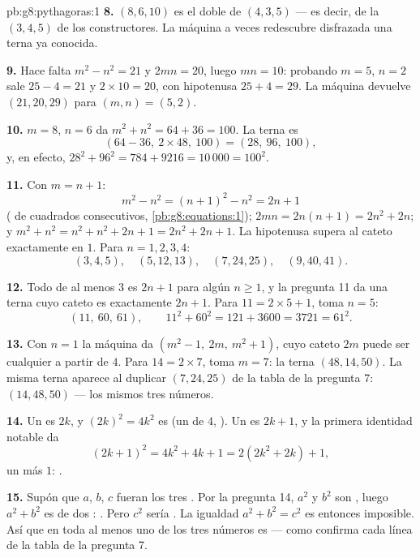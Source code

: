\begin{solution}{pb:g8:pythagoras:1}
\textbf{8.} $(8, 6, 10)$ es el doble de $(4, 3, 5)$ --- es decir,
de la $(3, 4, 5)$ de los constructores. La máquina a veces
redescubre disfrazada una terna ya conocida.

\textbf{9.} Hace falta $m^2 - n^2 = 21$ y $2mn = 20$, luego
$mn = 10$: probando $m = 5$, $n = 2$ sale $25 - 4 = 21$ y
$2 \times 10 = 20$, con hipotenusa $25 + 4 = 29$. La máquina
devuelve $(21, 20, 29)$ para $(m, n) = (5, 2)$.

\textbf{10.} $m = 8$, $n = 6$ da $m^2 + n^2 = 64 + 36 = 100$.
La terna es
\[
\left(64 - 36,\ 2 \times 48,\ 100\right) = (28,\ 96,\ 100),
\]
y, en efecto, $28^2 + 96^2 = 784 + 9216 = 10\,000 = 100^2$.

\textbf{11.} Con $m = n + 1$:
\[
m^2 - n^2 = (n + 1)^2 - n^2 = 2n + 1
\]
( de cuadrados consecutivos, \cref{pb:g8:equations:1});
$2mn = 2n(n + 1) = 2n^2 + 2n$; y
$m^2 + n^2 = n^2 + n^2 + 2n + 1 = 2n^2 + 2n + 1$. La hipotenusa
supera al cateto  exactamente en $1$. Para $n = 1, 2, 3, 4$:
\[
(3, 4, 5), \quad (5, 12, 13), \quad (7, 24, 25), \quad
(9, 40, 41) .
\]

\textbf{12.} Todo  de al menos $3$ es $2n + 1$ para algún
$n \geq 1$, y la pregunta 11 da una terna cuyo cateto  es
exactamente $2n + 1$. Para $11 = 2 \times 5 + 1$, toma $n = 5$:
\[
(11,\ 60,\ 61),
\qquad
11^2 + 60^2 = 121 + 3600 = 3721 = 61^2 .
\]

\textbf{13.} Con $n = 1$ la máquina da
$\left(m^2 - 1,\ 2m,\ m^2 + 1\right)$, cuyo cateto  $2m$ puede ser
cualquier  a partir de $4$. Para $14 = 2 \times 7$, toma
$m = 7$: la terna $(48, 14, 50)$. La misma terna aparece al
duplicar $(7, 24, 25)$ de la tabla de la pregunta 7:
$(14, 48, 50)$ --- los mismos tres números.

\textbf{14.} Un  es $2k$, y $(2k)^2 = 4k^2$ es 
(un  de $4$, ). Un  es $2k + 1$, y la
primera identidad notable da
\[
(2k + 1)^2 = 4k^2 + 4k + 1 = 2\left(2k^2 + 2k\right) + 1 ,
\]
un  más $1$: .

\textbf{15.} Supón que $a$, $b$, $c$ fueran los tres . Por la pregunta
14, $a^2$ y $b^2$ son , luego $a^2 + b^2$ es  de dos : \emph{}. Pero $c^2$ sería \emph{}. La igualdad
$a^2 + b^2 = c^2$ es entonces imposible. Así que en toda  al menos uno de los tres números es  --- como confirma cada
línea de la tabla de la pregunta 7.
\end{solution}

